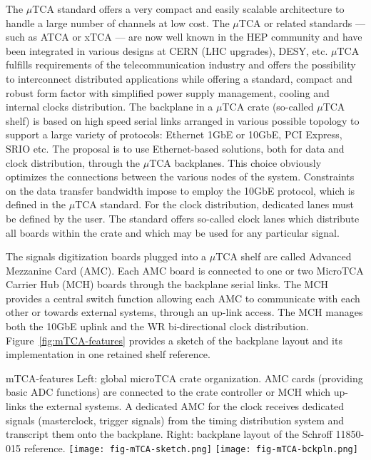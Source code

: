 The $\mu$TCA standard offers a very compact and easily scalable
architecture to handle a large number of channels at low cost. The
$\mu$TCA or related standards --- such as ATCA or xTCA --- are now
well known in the HEP community and have been integrated in various
designs at CERN (LHC upgrades), DESY, etc.  $\mu$TCA fulfills
requirements of the telecommunication industry and offers the
possibility to interconnect distributed applications while offering a
standard, compact and robust form factor with simplified power supply
management, cooling and internal clocks distribution. The backplane in
a $\mu$TCA crate (so-called $\mu$TCA shelf) is based on high speed
serial links arranged in various possible topology to support a large
variety of protocols: Ethernet 1GbE or 10GbE, PCI Express, SRIO
etc. The proposal is to use Ethernet-based solutions, both for data
and clock distribution, through the $\mu$TCA backplanes. This choice
obviously optimizes the connections between the various nodes of the
system. Constraints on the data transfer bandwidth impose to employ
the 10GbE protocol, which is defined in the $\mu$TCA standard. For the
clock distribution, dedicated lanes must be defined by the user. The
standard offers so-called clock lanes which distribute all boards
within the crate and which may be used for any particular signal.

The signals digitization boards plugged into a $\mu$TCA shelf are
called Advanced Mezzanine Card (AMC)\cite{picmg-2006}. Each AMC board
is connected to one or two MicroTCA Carrier Hub (MCH) boards through
the backplane serial links. The MCH provides a central switch function
allowing each AMC to communicate with each other or towards external
systems, through an up-link access. The MCH manages both the 10GbE
uplink and the WR bi-directional clock
distribution. Figure~\ref{fig:mTCA-features} provides a sketch of the
backplane layout and its implementation in one retained shelf
reference.
\begin{cdrfigure}{mTCA-features}
{\small Left: global microTCA crate organization. AMC cards 
(providing basic ADC functions) are connected to the crate 
controller or MCH which up-links the external systems. A dedicated 
AMC for the clock receives dedicated signals (masterclock, trigger 
signals) from the timing distribution system and transcript them onto 
the backplane. Right: backplane layout of the Schroff 11850-015 reference.}
\texttt{[image: fig-mTCA-sketch.png]}\hfill
\texttt{[image: fig-mTCA-bckpln.png]}
\end{cdrfigure}

